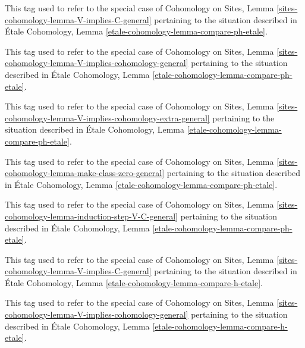 \begin{remark}
\label{remark-V-implies-C-etale-ph}
This tag used to refer to the special case of
Cohomology on Sites, Lemma \ref{sites-cohomology-lemma-V-implies-C-general}
pertaining to the situation described in
\'Etale Cohomology, Lemma \ref{etale-cohomology-lemma-compare-ph-etale}.
\end{remark}

\begin{remark}
\label{remark-V-implies-cohomology-etale-ph}
This tag used to refer to the special case of
Cohomology on Sites, Lemma
\ref{sites-cohomology-lemma-V-implies-cohomology-general}
pertaining to the situation described in
\'Etale Cohomology, Lemma \ref{etale-cohomology-lemma-compare-ph-etale}.
\end{remark}

\begin{remark}
\label{remark-V-implies-cohomology-etale-ph-extra}
This tag used to refer to the special case of
Cohomology on Sites, Lemma
\ref{sites-cohomology-lemma-V-implies-cohomology-extra-general}
pertaining to the situation described in
\'Etale Cohomology, Lemma \ref{etale-cohomology-lemma-compare-ph-etale}.
\end{remark}

\begin{remark}
\label{remark-make-class-zero}
This tag used to refer to the special case of
Cohomology on Sites, Lemma
\ref{sites-cohomology-lemma-make-class-zero-general}
pertaining to the situation described in
\'Etale Cohomology, Lemma \ref{etale-cohomology-lemma-compare-ph-etale}.
\end{remark}

\begin{remark}
\label{remark-induction-step-V-C-etale-ph}
This tag used to refer to the special case of
Cohomology on Sites, Lemma
\ref{sites-cohomology-lemma-induction-step-V-C-general}
pertaining to the situation described in
\'Etale Cohomology, Lemma \ref{etale-cohomology-lemma-compare-ph-etale}.
\end{remark}

\begin{remark}
\label{remark-V-implies-C-etale-h}
This tag used to refer to the special case of
Cohomology on Sites, Lemma \ref{sites-cohomology-lemma-V-implies-C-general}
pertaining to the situation described in
\'Etale Cohomology, Lemma \ref{etale-cohomology-lemma-compare-h-etale}.
\end{remark}

\begin{remark}
\label{remark-V-implies-cohomology-etale-h}
This tag used to refer to the special case of
Cohomology on Sites, Lemma
\ref{sites-cohomology-lemma-V-implies-cohomology-general}
pertaining to the situation described in
\'Etale Cohomology, Lemma \ref{etale-cohomology-lemma-compare-h-etale}.
\end{remark}

